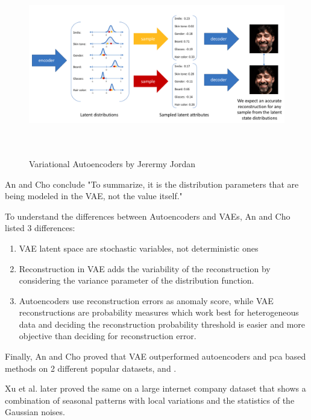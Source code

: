 \begin{figure}[ht]
    \hspace*{-1in}
    \centering
    \includegraphics[width = 17cm, height = 8cm]{images/vaes.png}
    \caption[]{Variational Autoencoders by Jerermy Jordan \cite{jjordan}}
    \label{fig:vaes}
\end{figure}

An and Cho \cite{ancho} conclude "To summarize, it is the distribution parameters that are being modeled in the VAE, not the value itself."

To understand the differences between Autoencoders and VAEs, An and Cho \cite{ancho} listed 3 differences:

\begin{enumerate}
    \item VAE latent space are stochastic variables, not deterministic ones
    \item Reconstruction in VAE adds the variability of the reconstruction by considering the variance parameter of the distribution function.
    \item Autoencoders use reconstruction errors as anomaly score, while VAE reconstructions are probability measures which work best for heterogeneous data and deciding the reconstruction probability threshold is easier and more objective than deciding for reconstruction error.
\end{enumerate}

Finally, An and Cho \cite{ancho} proved that VAE outperformed autoencoders and \acrshort{pca} based methods on 2 different popular datasets,  \cite{mnist} and  \cite{kdd}.

Xu et al. later proved the same on a large internet company dataset that shows a combination of seasonal patterns with local variations and the statistics of the Gaussian noises.

